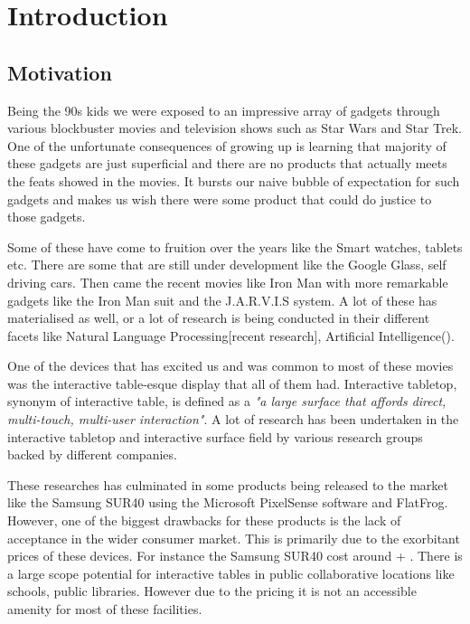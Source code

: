 
\chapter{Introduction}

\section{Motivation}
Being the 90s kids we were exposed to an impressive array of gadgets through various blockbuster movies and television shows such as Star Wars and Star Trek. One of the unfortunate consequences of growing up is learning that majority of these gadgets are just superficial and there are no products that actually meets the feats showed in the movies. It bursts our naive bubble of expectation for such gadgets and makes us wish there were some product that could do justice to those gadgets. 

Some of these have come to fruition over the years like the Smart watches, tablets etc. There are some that are still under development like the Google Glass, self driving cars. Then came the recent movies like Iron Man with more remarkable gadgets like the Iron Man suit and the J.A.R.V.I.S system. A lot of these has materialised as well, or a lot of research is being conducted in their different facets like Natural Language Processing[recent research], Artificial Intelligence().

One of the devices that has excited us and was common to most of these movies was the interactive table-esque display that all of them had. Interactive tabletop, synonym of interactive table, is defined as a \emph{"a large surface that affords direct, multi-touch, multi-user interaction"}\cite{interactive-table-def}. A lot of research has been undertaken in the interactive tabletop and interactive surface field by various research groups backed by different companies. 

These researches has culminated in some products being released to the market like the Samsung SUR40 using the Microsoft PixelSense software\cite{samsung-sur40} and FlatFrog\cite{flatfrog}. However, one of the biggest drawbacks for these products is the lack of acceptance in the wider consumer market. This is primarily due to the exorbitant prices of these devices. For instance the Samsung SUR40 cost around + \cite{samsung-sur40-price}. There is a large scope potential for interactive tables in public collaborative locations like schools, public libraries. However due to the pricing it is not an accessible amenity for most of these facilities.

